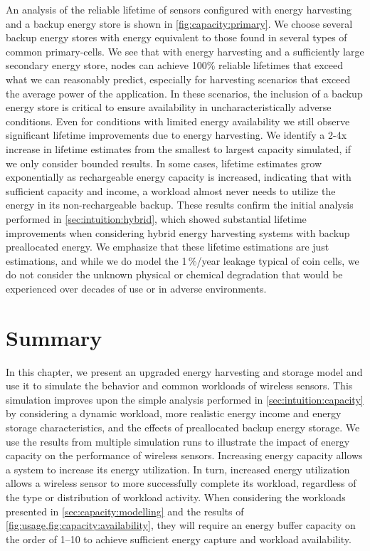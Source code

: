 An analysis of the reliable lifetime of sensors configured with energy
harvesting and a backup energy store is shown in \cref{fig:capacity:primary}.
We choose several backup energy
stores with energy equivalent to those found in several types of common
primary-cells. We see that with energy harvesting and a sufficiently
large secondary energy store, nodes can
achieve 100\% reliable lifetimes that exceed
what we can reasonably predict, especially for harvesting scenarios that
exceed the average power of the application. In these scenarios, 
the inclusion of a backup energy store is critical 
to ensure availability in uncharacteristically adverse conditions.
Even for conditions with
limited energy availability we still observe significant lifetime improvements
due to energy harvesting.
We identify a 2-4x increase in lifetime estimates from the smallest to largest
capacity simulated, if we only consider bounded results.
In some cases, lifetime estimates grow exponentially as rechargeable energy capacity is increased, indicating that with sufficient capacity and income, a workload almost never needs to utilize the energy in its non-rechargeable backup.
These results confirm the initial analysis performed in \cref{sec:intuition:hybrid}, which showed substantial lifetime improvements when considering hybrid energy harvesting systems with backup preallocated energy.
We emphasize that
these lifetime estimations are
just estimations, and while we do model the 1\,\%/year leakage
typical of coin cells, we do not consider the unknown
physical or chemical degradation that would be experienced over decades of use or in adverse environments.

\section{Summary}
In this chapter, we present an upgraded energy harvesting and storage model and use it to simulate the behavior and common workloads of wireless sensors.
This simulation improves upon the simple analysis performed in \cref{sec:intuition:capacity} by considering a dynamic workload, more realistic energy income and energy storage characteristics, and the effects of preallocated backup energy storage.
We use the results from multiple simulation runs to illustrate the impact of energy capacity on the performance of wireless sensors.
Increasing energy capacity allows a system to increase its energy utilization. In turn, increased energy utilization allows a wireless sensor to more successfully complete its workload, regardless of the type or distribution of workload activity.
When considering the workloads presented in \cref{sec:capacity:modelling} and the results of \cref{fig:usage,fig:capacity:availability}, they will require an energy buffer capacity on the order of 1--10\ssi{\milli\Wh} to achieve sufficient energy capture and workload availability.

